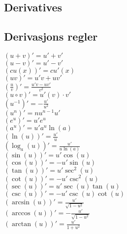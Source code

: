 \documentclass[a4paper,7pt,fleqn]{article}
\begin{document}
\newpage
\begin{multicols}{2}
\section{Derivatives}
\begin{minipage} {\linewidth}
    
\subsection{Derivasjons regler}
\((u + v)' = u' + v' \) \\
\((u - v)' = u' - v' \) \\
\((cu(x))' = cu'(x) \) \\
\((uv)' = u'v + uv' \) \\
\((\frac{u}{v})' = \frac{u'v - uv'}{v^2} \) \\
\((u \circ v)' = u'(v) \cdot v' \) \\
\((u^{-1})' = -\frac{u'}{u^2} \) \\
\((u^n)' = nu^{n-1}u' \) \\
\((e^u)' = u'e^u \) \\
\((a^u)' = u'a^u \ln(a) \) \\
\((\ln(u))' = \frac{u'}{u} \) \\
\((\log_a(u))' = \frac{u'}{u \ln(a)} \) \\
\((\sin(u))' = u'\cos(u) \) \\
\((\cos(u))' = -u'\sin(u) \) \\
\((\tan(u))' = u'\sec^2(u) \) \\
\((\cot(u))' = -u'\csc^2(u) \) \\
\((\sec(u))' = u'\sec(u)\tan(u) \) \\
\((\csc(u))' = -u'\csc(u)\cot(u) \) \\
\((\arcsin(u))' = \frac{u'}{\sqrt{1-u^2}} \) \\
\((\arccos(u))' = -\frac{u'}{\sqrt{1-u^2}} \) \\
\((\arctan(u))' = \frac{u'}{1+u^2} \) \\





\end{minipage}
\end{multicols}
\end{document}
